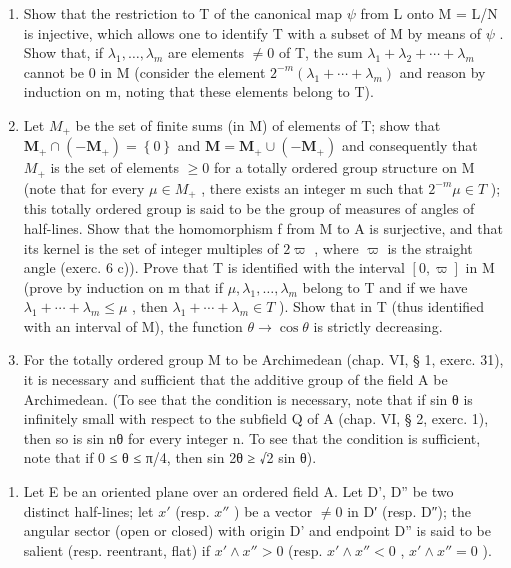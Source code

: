 \begin{enumerate}
\def\labelenumi{\alph{enumi})}
\setcounter{enumi}{2}
\item
  Show that the restriction to T of the canonical map \(\psi\) from L onto M = L/N is injective, which allows one to identify T with a subset of M by means of \(\psi\) . Show that, if \(\lambda_1, \ldots, \lambda_m\) are elements \(\neq 0\) of T, the sum \(\lambda_1 + \lambda_2 + \cdots + \lambda_m\) cannot be 0 in M (consider the element \(2^{-m}(\lambda_1 + \cdots + \lambda_m)\) and reason by induction on m, noting that these elements belong to T).
\item
  Let \(M_{+}\) be the set of finite sums (in M) of elements of T; show that \(\mathbf{M}_{+}\cap(-\mathbf{M}_{+})=\left\{0\right\}\) and \(\mathbf{M}=\mathbf{M}_{+}\cup(-\mathbf{M}_{+})\) and consequently that \(M_{+}\) is the set of elements \(\geqslant0\) for a totally ordered group structure on M (note that for every \(\mu\in M_{+}\) , there exists an integer m such that \(2^{-m}\mu\in T\) ); this totally ordered group is said to be the group of measures of angles of half-lines. Show that the homomorphism f from M to A is surjective, and that its kernel is the set of integer multiples of \(2\varpi\) , where \(\varpi\) is the straight angle (exerc. 6 c)). Prove that T is identified with the interval \([0,\varpi]\) in M (prove by induction on m that if \(\mu,\lambda_{1},\ldots,\lambda_{m}\) belong to T and if we have \(\lambda_{1}+\cdots+\lambda_{m}\leqslant\mu\) , then \(\lambda_{1}+\cdots+\lambda_{m}\in T\) ). Show that in T (thus identified with an interval of M), the function \(\theta\to\cos\theta\) is strictly decreasing.
\item
  For the totally ordered group M to be Archimedean (chap. VI, § 1, exerc. 31), it is necessary and sufficient that the additive group of the field A be Archimedean. (To see that the condition is necessary, note that if sin θ is infinitely small with respect to the subfield Q of A (chap. VI, § 2, exerc. 1), then so is sin nθ for every integer n. To see that the condition is sufficient, note that if 0 ≤ θ ≤ π/4, then sin 2θ ≥ √2 sin θ).
\end{enumerate}

\begin{enumerate}
\def\labelenumi{\arabic{enumi})}
\setcounter{enumi}{7}
\tightlist
\item
  Let E be an oriented plane over an ordered field A. Let D', D'' be two distinct half-lines; let \(x'\) (resp. \(x''\) ) be a vector \(\neq 0\) in D′ (resp. D″); the angular sector (open or closed) with origin D' and endpoint D'' is said to be salient (resp. reentrant, flat) if \(x' \wedge x'' > 0\) (resp. \(x' \wedge x'' < 0\) , \(x' \wedge x'' = 0\) ).
\end{enumerate}

